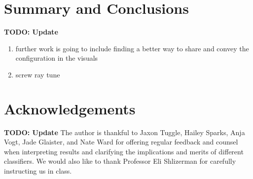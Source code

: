 \documentclass[11pt]{amsart}
\begin{document}
\section{Summary and Conclusions}\label{sec:conclusions} 
\textbf{TODO: Update}
\begin{enumerate}
\item further work is going to include finding a better way to share and convey the configuration in the visuals
\item screw ray tune
\end{enumerate}

\section*{Acknowledgements}
\textbf{TODO: Update}
The author is thankful to Jaxon Tuggle, Hailey Sparks, Anja Vogt, Jade Glaister, and Nate Ward for offering regular feedback and counsel when interpreting results and clarifying the implications and merits of different classifiers.
We would also like to thank Professor Eli Shlizerman for carefully instructing us in class.


\end{document}
